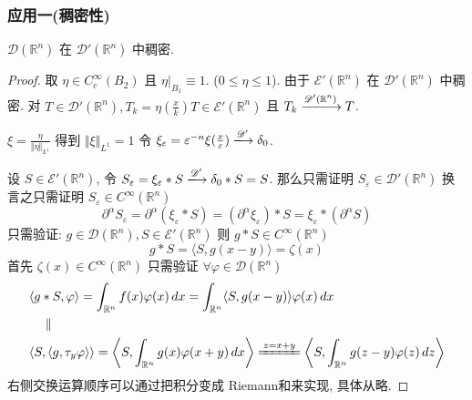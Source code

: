 \documentclass[11pt]{ctexart}[UTF8]
\begin{document}
\subsubsection*{应用一(稠密性)}
\begin{proposition}
    $\mathscr{D}(\mathbb{R}^{n})$ 在 $\mathscr{D}'(\mathbb{R}^{n})$ 中稠密.
\end{proposition}
\begin{proof}
    取 $\eta \in C_{c}^{\infty}(B_{2})$ 且 $\eta\big|_{B_{1}} \equiv 1$. ($0 \leq \eta \leq 1$). 由于 $\mathscr{E}'(\mathbb{R}^{n})$ 在 $\mathscr{D}'(\mathbb{R}^{n})$ 中稠密.
    对 $T \in \mathscr{D}'(\mathbb{R}^{n}), T_{k} = \eta(\frac{x}{k})T \in \mathscr{E}'(\mathbb{R}^{n})$ 且 $T_{k} \xlongrightarrow{\mathscr{D}'(\mathbb{R}^{n})} T$.\par
    $\xi = \frac{\eta}{\Vert \eta \Vert_{L^1}}$ 得到 $\Vert \xi \Vert_{L^1} = 1$ 令 $\xi_{\varepsilon} = \varepsilon^{-n}\xi(\frac{x}{\varepsilon}) \xlongrightarrow{\mathscr{D}'} \delta_{0}$.\par
    设 $S \in \mathscr{E}'(\mathbb{R}^{n})$, 令 $S_{\varepsilon} = \xi_{\varepsilon} * S \xlongrightarrow{\mathscr{D}'} \delta_{0} * S = S$. 
    那么只需证明 $S_{\varepsilon} \in \mathscr{D}'(\mathbb{R}^{n})$ 换言之只需证明 $S_{\varepsilon} \in C^{\infty}(\mathbb{R}^{n})$
    $$ \partial^{\alpha} S_{\varepsilon} = \partial^{\alpha}(\xi_{\varepsilon} * S) = (\partial^{\alpha} \xi_{\varepsilon}) * S = \xi_{\varepsilon} * (\partial^{\alpha} S)$$
    只需验证: $g \in \mathscr{D}(\mathbb{R}^{n}), S \in \mathscr{E}'(\mathbb{R}^{n})$ 则 $g * S \in C^{\infty}(\mathbb{R}^{n})$
    $$ g * S = \langle S, g(x-y) \rangle  = \zeta(x)$$
    首先 $\zeta(x) \in C^{\infty}(\mathbb{R}^{n})$ 只需验证 $\forall \varphi \in \mathscr{D}(\mathbb{R}^{n})$
    \begin{equation*}
        \begin{aligned}
            &\langle g * S, \varphi \rangle = \int_{\mathbb{R}^n} f(x) \varphi(x) \, dx = \int_{\mathbb{R}^n} \langle S, g(x-y) \rangle \varphi(x) \, dx \\
                &\quad \parallel \\
            &\langle S, \langle g, \tau_y \varphi \rangle \rangle = \left\langle S, \int_{\mathbb{R}^n} g(x) \varphi(x+y) \, dx \right\rangle \xlongequal{z=x+y} \left\langle S, \int_{\mathbb{R}^n} g(z-y) \varphi(z) \, dz \right\rangle
        \end{aligned}
    \end{equation*}
右侧交换运算顺序可以通过把积分变成 Riemann和来实现, 具体从略.
\end{proof}
\end{document}
